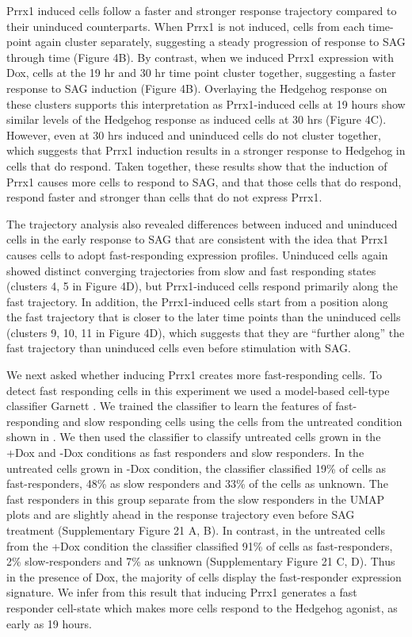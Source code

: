 Prrx1 induced cells follow a faster and stronger response trajectory compared to their uninduced counterparts. When Prrx1 is not induced, cells from each time-point again cluster separately, suggesting a steady progression of response to SAG through time (Figure 4B). By contrast, when we induced Prrx1 expression with Dox, cells at the 19 hr and 30 hr time point cluster together, suggesting a faster response to SAG induction (Figure 4B). Overlaying the Hedgehog response on these clusters supports this interpretation as Prrx1-induced cells at 19 hours show similar levels of the Hedgehog response as induced cells at 30 hrs (Figure 4C). However, even at 30 hrs induced and uninduced cells do not cluster together, which suggests that Prrx1 induction results in a stronger response to Hedgehog in cells that do respond. Taken together, these results show that the induction of Prrx1 causes more cells to respond to SAG, and that those cells that do respond, respond faster and stronger than cells that do not express Prrx1.

The trajectory analysis also revealed differences between induced and uninduced cells in the early response to SAG that are consistent with the idea that Prrx1 causes cells to adopt fast-responding expression profiles. Uninduced cells again showed distinct converging trajectories from slow and fast responding states (clusters 4, 5 in Figure 4D), but Prrx1-induced cells respond primarily along the fast trajectory. In addition, the Prrx1-induced cells start from a position along the fast trajectory that is closer to the later time points than the uninduced cells (clusters 9, 10, 11 in Figure 4D), which suggests that they are “further along” the fast trajectory than uninduced cells even before stimulation with SAG. 

We next asked whether inducing Prrx1 creates more fast-responding cells. To detect fast responding cells in this experiment we used a model-based cell-type classifier Garnett \cite{Pliner2019-vn}. We trained the classifier to learn the features of fast-responding and slow responding cells using the cells from the untreated condition shown in . We then used the classifier to classify untreated cells grown in the +Dox and -Dox conditions as fast responders and slow responders. In the untreated cells grown in -Dox condition, the classifier classified 19\% of cells as fast-responders, 48\% as slow responders and 33\% of the cells as unknown. The fast responders in this group separate from the slow responders in the UMAP plots and are slightly ahead in the response trajectory even before SAG treatment  (Supplementary Figure 21 A, B). In contrast, in the untreated cells from the +Dox condition the classifier classified 91\% of cells as fast-responders, 2\% slow-responders and 7\% as unknown (Supplementary Figure 21 C, D). Thus in the presence of Dox, the majority of cells display the fast-responder expression signature. We infer from this result that inducing Prrx1 generates a fast responder cell-state which makes more cells respond to the Hedgehog agonist, as early as 19 hours.

